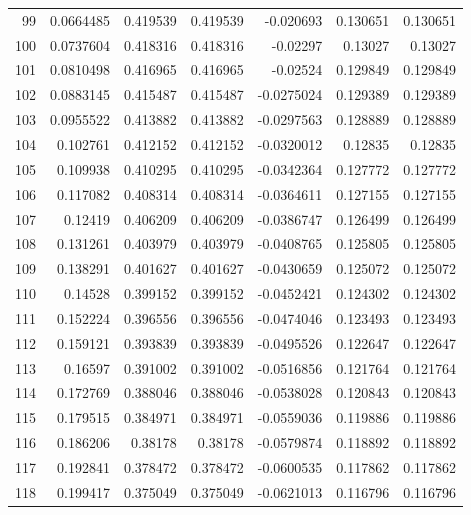 \begin{tabular}{rrrrrrr}
  99 &  0.0664485   & 0.419539    & 0.419539    & -0.020693    & 0.130651    & 0.130651    \\
 100 &  0.0737604   & 0.418316    & 0.418316    & -0.02297     & 0.13027     & 0.13027     \\
 101 &  0.0810498   & 0.416965    & 0.416965    & -0.02524     & 0.129849    & 0.129849    \\
 102 &  0.0883145   & 0.415487    & 0.415487    & -0.0275024   & 0.129389    & 0.129389    \\
 103 &  0.0955522   & 0.413882    & 0.413882    & -0.0297563   & 0.128889    & 0.128889    \\
 104 &  0.102761    & 0.412152    & 0.412152    & -0.0320012   & 0.12835     & 0.12835     \\
 105 &  0.109938    & 0.410295    & 0.410295    & -0.0342364   & 0.127772    & 0.127772    \\
 106 &  0.117082    & 0.408314    & 0.408314    & -0.0364611   & 0.127155    & 0.127155    \\
 107 &  0.12419     & 0.406209    & 0.406209    & -0.0386747   & 0.126499    & 0.126499    \\
 108 &  0.131261    & 0.403979    & 0.403979    & -0.0408765   & 0.125805    & 0.125805    \\
 109 &  0.138291    & 0.401627    & 0.401627    & -0.0430659   & 0.125072    & 0.125072    \\
 110 &  0.14528     & 0.399152    & 0.399152    & -0.0452421   & 0.124302    & 0.124302    \\
 111 &  0.152224    & 0.396556    & 0.396556    & -0.0474046   & 0.123493    & 0.123493    \\
 112 &  0.159121    & 0.393839    & 0.393839    & -0.0495526   & 0.122647    & 0.122647    \\
 113 &  0.16597     & 0.391002    & 0.391002    & -0.0516856   & 0.121764    & 0.121764    \\
 114 &  0.172769    & 0.388046    & 0.388046    & -0.0538028   & 0.120843    & 0.120843    \\
 115 &  0.179515    & 0.384971    & 0.384971    & -0.0559036   & 0.119886    & 0.119886    \\
 116 &  0.186206    & 0.38178     & 0.38178     & -0.0579874   & 0.118892    & 0.118892    \\
 117 &  0.192841    & 0.378472    & 0.378472    & -0.0600535   & 0.117862    & 0.117862    \\
 118 &  0.199417    & 0.375049    & 0.375049    & -0.0621013   & 0.116796    & 0.116796    \\

\end{tabular}

